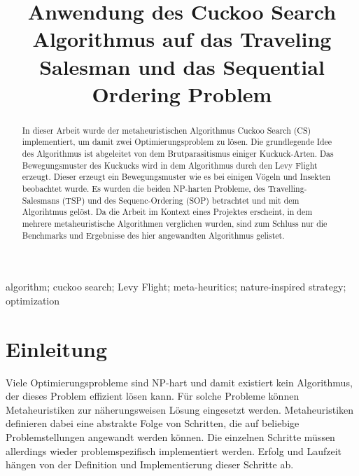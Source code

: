 \documentclass[conference]{IEEEtran}
\begin{document}
  \title{Anwendung des Cuckoo Search Algorithmus auf das Traveling Salesman und das Sequential Ordering Problem}

  \author{
    \and
  }

  \maketitle

  \begin{abstract}
In dieser Arbeit wurde der metaheuristischen Algorithmus Cuckoo Search (CS) implementiert, um damit zwei Optimierungsproblem zu lösen. Die grundlegende Idee des Algorithmus ist abgeleitet von dem Brutparasitismus einiger Kuckuck-Arten. Das Bewegungsmuster des Kuckucks wird in dem Algorithmus durch den Levy Flight erzeugt. Dieser erzeugt ein Bewegungsmuster wie es bei einigen Vögeln und Insekten beobachtet wurde.  Es wurden die beiden NP-harten Probleme, des Travelling-Salesmans (TSP) und des Sequenc-Ordering (SOP) betrachtet und mit dem Algorihtmus gelöst. Da die Arbeit im Kontext eines Projektes erscheint, in dem mehrere metaheuristische Algorithmen verglichen wurden, sind zum Schluss nur die Benchmarks und Ergebnisse des hier angewandten Algorithmus gelistet.
  \end{abstract}

  \begin{IEEEkeywords}
    algorithm; cuckoo search; Levy Flight; meta-heuritics; nature-inspired strategy; optimization
  \end{IEEEkeywords}

  \section{Einleitung}
    Viele Optimierungsprobleme sind NP-hart und damit existiert kein Algorithmus, der dieses Problem effizient lösen kann. Für solche Probleme können Metaheuristiken zur näherungsweisen Lösung eingesetzt werden. Metaheuristiken definieren dabei eine abstrakte Folge von Schritten, die auf beliebige Problemstellungen angewandt werden können. Die einzelnen Schritte müssen allerdings wieder problemspezifisch implementiert werden. Erfolg und Laufzeit hängen von der Definition und Implementierung dieser Schritte ab. 
\end{document}
